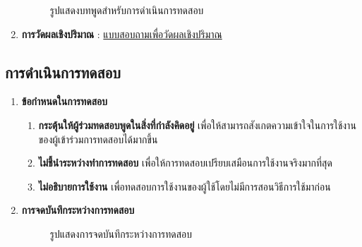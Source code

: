 \begin{enumerate}
\begin{figure}[H]
        \caption{รูปแสดงบทพูดสำหรับการดำเนินการทดสอบ}\label{fig:ScriptUT}
    \end{figure}
    \item \textbf{การวัดผลเชิงปริมาณ} : \href{https://forms.gle/cRmAQGtgpfCHbK5u8}{แบบสอบถามเพื่อวัดผลเชิงปริมาณ}
\end{enumerate}
\subsection{การดำเนินการทดสอบ}
\begin{enumerate}
    \item \textbf{ข้อกำหนดในการทดสอบ}
    \begin{enumerate}
        \item \textbf{กระตุ้นให้ผู้ร่วมทดสอบพูดในสิ่งที่กำลังคิดอยู่} เพื่อให้สามารถสังเกตความเข้าใจในการใช้งานของผู้เข้าร่วมการทดสอบได้มากขึ้น
        \item \textbf{ไม่ชี้นำระหว่างทำการทดสอบ} เพื่อให้การทดสอบเปรียบเสมือนการใช้งานจริงมากที่สุด
        \item \textbf{ไม่อธิบายการใช้งาน} เพื่อทดสอบการใช้งานของผู้ใช้โดยไม่มีการสอนวิธีการใช้มาก่อน
    \end{enumerate}
    \item \textbf{การจดบันทึกระหว่างการทดสอบ}
    \begin{figure}[H]\centering
        \caption{รูปแสดงการจดบันทึกระหว่างการทดสอบ}\label{fig:NoteTaking}
    \end{figure}
\end{enumerate}
